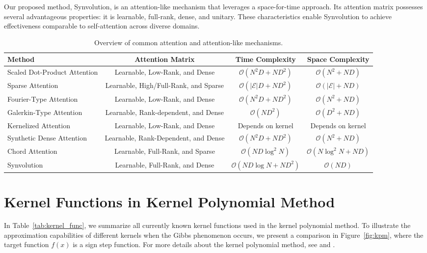 Our proposed method, Synvolution, is an attention-like mechanism that leverages a space-for-time approach. Its attention matrix possesses several advantageous properties: it is learnable, full-rank, dense, and unitary. These characteristics enable Synvolution to achieve effectiveness comparable to self-attention across diverse domains.

\begin{table*}[!h]
\centering
\caption{Overview of common attention and attention-like mechanisms.}\label{tab:attention}
\begin{tabular}{lccc}
\toprule
Method & Attention Matrix & Time Complexity & Space Complexity \\
\midrule
Scaled Dot-Product Attention & Learnable, Low-Rank, and Dense & $\mathcal{O}(N^{2}D + ND^{2})$ & $\mathcal{O}(N^{2} + ND)$ \\
Sparse Attention & Learnable, High/Full-Rank, and Sparse & $\mathcal{O}(|\mathcal{E}|D + ND^{2})$ & $\mathcal{O}(|\mathcal{E}| + ND)$ \\
Fourier-Type Attention & Learnable, Low-Rank, and Dense & $\mathcal{O}(N^{2}D + ND^{2})$ & $\mathcal{O}(N^{2} + ND)$ \\
Galerkin-Type Attention & Learnable, Rank-dependent, and Dense & $\mathcal{O}(ND^{2})$ & $\mathcal{O}(D^{2} + ND)$ \\
Kernelized Attention & Learnable, Low-Rank, and Dense & Depends on kernel & Depends on kernel \\
Synthetic Dense Attention & Learnable, Rank-Dependent, and Dense & $\mathcal{O}(N^{2}D + ND^{2})$ & $\mathcal{O}(N^{2} + ND)$ \\
Chord Attention & Learnable, Full-Rank, and Sparse & $\mathcal{O}(ND\log^{2}{N})$ & $\mathcal{O}(N\log^{2}{N} + ND)$ \\
\midrule
Synvolution & Learnable, Full-Rank, and Dense & $\mathcal{O}(ND\log{N}+ND^{2})$ & $\mathcal{O}(ND)$ \\
\bottomrule
\end{tabular}
\end{table*}

\section{Kernel Functions in Kernel Polynomial Method}
In Table~\ref{tab:kernel_func}, we summarize all currently known kernel functions used in the kernel polynomial method. To illustrate the approximation capabilities of different kernels when the Gibbs phenomenon occurs, we present a comparison in Figure~\ref{fig:kpm}, where the target function $f(x)$ is a sign step function. For more details about the kernel polynomial method, see \citet{RevModPhys.78.275} and \citet{Weiße2008}.

